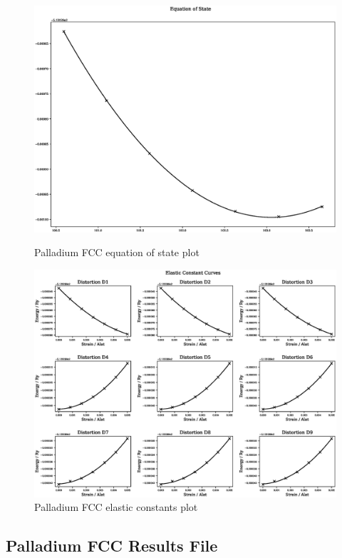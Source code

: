 \FloatBarrier
\begin{figure}[!htb]
\includegraphics[width=\linewidth]{appendix/dft_property_calculations/fccpd/eos.eps}
\caption{Palladium FCC equation of state plot}
\label{fig:pdeosplot}
\endminipage\hfill
{}
\includegraphics[width=\linewidth]{appendix/dft_property_calculations/fccpd/ec.eps}
\caption{Palladium FCC elastic constants plot}
\label{fig:pdecplot}
\endminipage
\end{figure}
\FloatBarrier


\clearpage
\FloatBarrier
\subsection{Palladium FCC Results File}


